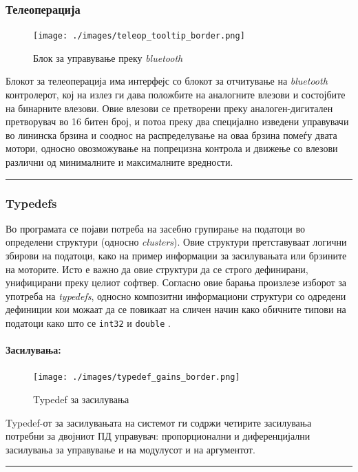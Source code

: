\documentclass[11pt]{article}
\begin{document}
    \subsubsection{Телеоперација}
	    \begin{figure}[H]
        \centering
	      \texttt{[image: ./images/teleop\_tooltip\_border.png]}
		    \caption{Блок за управување преку \textit{bluetooth}}
	      \label{fig:teleop}
	      \end{figure}
	    Блокот за телеоперација има интерфејс со блокот за отчитување на \textit{bluetooth} контролерот, кој на излез ги дава положбите на аналогните влезови и состојбите на бинарните влезови. Овие влезови се претворени преку аналоген-дигитален претворувач во 16 битен број, и потоа преку два специјално изведени управувачи во лининска брзина и сооднос на распределување на оваа брзина помеѓу двата мотори, односно овозможување на попрецизна контрола и движење со влезови различни од минималните и максималните вредности.\\
      \textcolor[RGB]{150,150,150}{\rule{\linewidth}{1.6pt}}

    \subsubsection{Typedefs}
      \label{sec:typedefs}
      Во програмата се појави потреба на засебно групирање на податоци во определени структури (односно \textit{clusters}). Овие структури претставуваат логични збирови на податоци, како на пример информации за засилувањата или брзините на моторите. Исто е важно да овие структури да се строго дефинирани, унифицирани преку целиот софтвер. Согласно овие барања произлезе изборот за употреба на \textit{typedefs}, односно композитни информациони структури со одредени дефиниции кои можаат да се повикаат на сличен начин како обичните типови на податоци како што се \verb+int32+ и \verb+double+ \cite{lvforeveryone}.

      \paragraph{Засилувања:\\}
	      \begin{figure}[H]
          \centering
	        \texttt{[image: ./images/typedef\_gains\_border.png]}
		      \caption{Typedef за засилувања}
	        \label{fig:gain_typedef}
	        \end{figure}
        Typedef-от за засилувањата на системот ги содржи четирите засилувања потребни за двојниот ПД управувач: пропорционални и диференцијални засилувања за управување и на модулусот и на аргументот.\\
        \textcolor[RGB]{150,150,150}{\rule{\linewidth}{1.6pt}}
\end{document}
